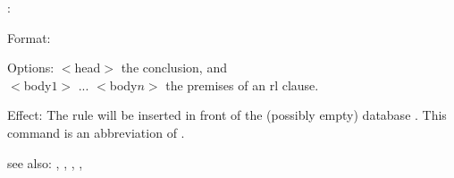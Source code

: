 :

Format: 

Options: $<$head$>$ the conclusion, and\\
         $<$body$1>$ ... $<$body$n>$ the premises of an rl clause.

Effect: The rule  will be inserted in front of the 
	(possibly empty) database . 
	This command is an abbreviation of .

see also: , , \consult, \destroy, \replace
